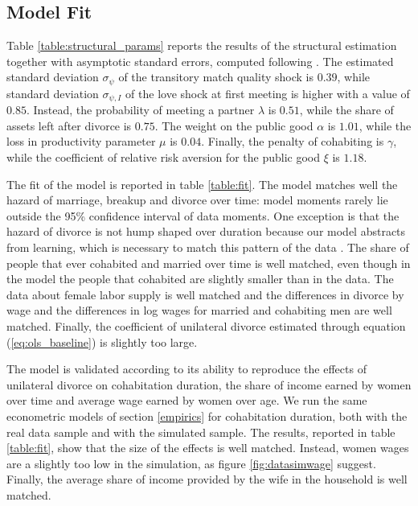 \documentclass[12pt]{article}
\numberwithin{table}{section}
\begin{document}
\subsection{Model Fit}
Table \ref{table:structural_params} reports the results of the structural estimation together with asymptotic standard errors, computed following \cite{adda2003}. The estimated standard deviation $\sigma_{\psi}$ of the transitory match quality shock is $0.39$, while standard deviation $\sigma_{\psi,I}$ of the love shock at first meeting is higher with a value of $0.85$. Instead, the probability of meeting a partner $\lambda$ is $0.51$, while the share of assets left after divorce is $0.75$. The weight on the public good $\alpha$ is $1.01$, while the loss in productivity parameter $\mu$ is $0.04$. Finally, the penalty of cohabiting is $\gamma$, while the coefficient of relative risk aversion for the public good $\xi$ is $1.18$.

The fit of the model is reported in table \ref{table:fit}. The model matches well the hazard of marriage, breakup and divorce over time: model moments rarely lie outside the 95\% confidence interval of data moments. One exception is that the hazard of divorce is not hump shaped over duration because our model abstracts from learning, which is necessary to match this pattern of the data \citep{blasutto2020} . The share of people that ever cohabited and married over time is well matched, even though in the model the people that cohabited are slightly smaller than in the data. The data about female labor supply is well matched and the differences in divorce by wage and the differences in log wages for married and cohabiting men are well matched. Finally, the coefficient of unilateral divorce estimated through equation (\ref{eq:ols_baseline}) is slightly too large.

The model is validated according to its ability to reproduce the effects of unilateral divorce on cohabitation duration, the share of income earned by women over time and average wage earned by women over age. We run the same econometric models of section \ref{empirics} for cohabitation duration, both with the real data sample and with the simulated sample. The results, reported in table \ref{table:fit}, show that the size of the effects is well matched. Instead, women wages are a slightly too low in the simulation, as figure \ref{fig:datasimwage} suggest. Finally, the average share of income provided by the wife in the household is well matched.
\end{document}
